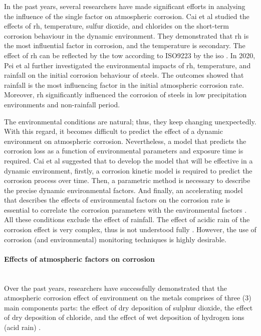 In the past years, several researchers have made significant efforts in analysing the influence of the single factor on atmospheric corrosion. Cai et al \cite{cai2018influence} studied the effects of \acrshort{rh}, temperature, sulfur dioxide, and chlorides on the short-term corrosion behaviour in the dynamic environment. They demonstrated that \acrshort{rh} is the most influential factor in corrosion, and the temperature is secondary. The effect of \acrshort{rh} can be reflected by the \acrfull{tow} according to ISO9223 by the \Acrfull{iso} \cite{cengel1998heat, islam2018effects}. In 2020, Pei et al \cite{pei2021understanding} further investigated the environmental impacts of \acrshort{rh}, temperature, and rainfall on the initial corrosion behaviour of steels. The outcomes showed that rainfall is the most influencing factor in the initial atmospheric corrosion rate.  Moreover, \acrshort{rh} significantly influenced the corrosion of steels in low precipitation environments and non-rainfall period.

The environmental conditions are natural; thus, they keep changing unexpectedly. With this regard, it becomes difficult to predict the effect of a dynamic environment on atmospheric corrosion. Nevertheless, a model that predicts the corrosion loss as a function of environmental parameters and exposure time is required. Cai et al \cite{cai2018influence} suggested that to develop the model that will be effective in a dynamic environment, firstly, a corrosion kinetic model is required to predict the corrosion process over time. Then, a parametric method is necessary to describe the precise dynamic environmental factors. And finally, an accelerating model that describes the effects of environmental factors on the corrosion rate is essential to correlate the corrosion parameters with the environmental factors \cite{loto2019performance}. All these conditions exclude the effect of rainfall. The effect of acidic rain of the corrosion effect is very complex, thus is not understood fully \cite{pei2021understanding}. However, the use of corrosion (and environmental) monitoring techniques is highly desirable.

\paragraph{Effects of atmospheric factors on corrosion} \hfill \\
Over the past years, researchers have successfully demonstrated that the atmospheric corrosion effect of environment on the metals comprises of three (3) main components parts: the effect of dry deposition of sulphur dioxide, the effect of dry deposition of chloride, and the effect of wet deposition of hydrogen ions (acid rain) \cite{cai2018influence}.

